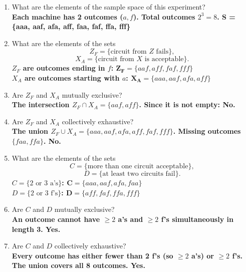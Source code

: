 \documentclass{article}
\begin{document}
\begin{enumerate}[label=(\alph*)]
    \item What are the elements of the sample space of this experiment? \\
    {\boldmath\textbf{Each machine has 2 outcomes ($a, f$). Total outcomes $2^3 = 8$. S = \{aaa, aaf, afa, aff, faa, faf, ffa, fff\}}}
    
    \item What are the elements of the sets
    \[ Z_F = \{ \text{circuit from } Z \text{ fails} \}, \]
    \[ X_A = \{ \text{circuit from } X \text{ is acceptable} \}. \]
    {\boldmath\textbf{$Z_F$ are outcomes ending in $f$: $\mathbf{Z_F} = \{aaf, aff, faf, fff\}$}} \\
    {\boldmath\textbf{$X_A$ are outcomes starting with $a$: $\mathbf{X_A} = \{aaa, aaf, afa, aff\}$}}
    
    \item Are $Z_F$ and $X_A$ mutually exclusive? \\
    {\boldmath\textbf{The intersection $Z_F \cap X_A = \{aaf, aff\}$. Since it is not empty: No.}}
    
    \item Are $Z_F$ and $X_A$ collectively exhaustive? \\
    {\boldmath\textbf{The union $Z_F \cup X_A = \{aaa, aaf, afa, aff, faf, fff\}$. Missing outcomes $\{faa, ffa\}$. No.}}
    
    \item What are the elements of the sets
    \[ C = \{ \text{more than one circuit acceptable} \}, \]
    \[ D = \{ \text{at least two circuits fail} \}. \]
    {\boldmath\textbf{$C = \{2 \text{ or } 3 \text{ a's} \}$: $\mathbf{C} = \{aaa, aaf, afa, faa\}$}} \\
    {\boldmath\textbf{$D = \{2 \text{ or } 3 \text{ f's} \}$: $\mathbf{D} = \{aff, faf, ffa, fff\}$}}
    
    \item Are $C$ and $D$ mutually exclusive? \\
    {\boldmath\textbf{An outcome cannot have $\ge 2$ a's and $\ge 2$ f's simultaneously in length 3. Yes.}}
    
    \item Are $C$ and $D$ collectively exhaustive? \\
    {\boldmath\textbf{Every outcome has either fewer than 2 f's (so $\ge 2$ a's) or $\ge 2$ f's. The union covers all 8 outcomes. Yes.}}
\end{enumerate}
\end{document}
